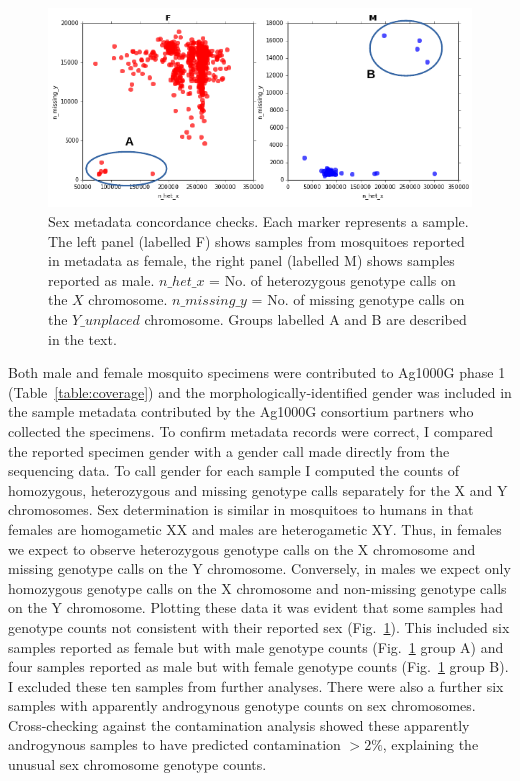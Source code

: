 \documentclass[a4paper,11pt,abstracton,hidelinks]{scrartcl}
\begin{document}
\begin{figure}[t!]
\centering
\includegraphics[width=\textwidth]{artwork/chapter3/sex.pdf}
\caption{Sex metadata concordance checks.
%
Each marker represents a sample.
%
The left panel (labelled F) shows samples from mosquitoes reported in metadata as female, the right panel (labelled M) shows samples reported as male.
%
$n\_het\_x$ = No. of heterozygous genotype calls on the $X$ chromosome.
%
$n\_missing\_y$ = No. of missing genotype calls on the $Y\_unplaced$ chromosome.
%
Groups labelled A and B are described in the text.
%
}
%
\label{fig:sex}
\end{figure}


Both male and female mosquito specimens were contributed to Ag1000G phase 1 (Table~\ref{table:coverage}) and the morphologically-identified gender was included in the sample metadata contributed by the Ag1000G consortium partners who collected the specimens.
%
To confirm metadata records were correct, I compared the reported specimen gender with a gender call made directly from the sequencing data.
%
To call gender for each sample I computed the counts of homozygous, heterozygous and missing genotype calls separately for the X and Y chromosomes. 
%
Sex determination is similar in mosquitoes to humans in that females are homogametic XX and males are heterogametic XY.
%
Thus, in females we expect to observe heterozygous genotype calls on the X chromosome and missing genotype calls on the Y chromosome.
%
Conversely, in males we expect only homozygous genotype calls on the X chromosome and non-missing genotype calls on the Y chromosome.
%
Plotting these data it was evident that some samples had genotype counts not consistent with their reported sex (Fig.~\ref{fig:sex}).
%
This included six samples reported as female but with male genotype counts (Fig.~\ref{fig:sex} group A) and four samples reported as male but with female genotype counts (Fig.~\ref{fig:sex} group B).
%
I excluded these ten samples from further analyses.
%
There were also a further six samples with apparently androgynous genotype counts on sex chromosomes.
%
Cross-checking against the contamination analysis showed these apparently androgynous samples to have predicted contamination $>2\%$, explaining the unusual sex chromosome genotype counts.
\end{document}
